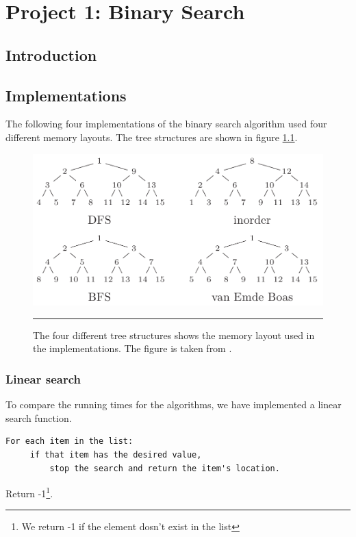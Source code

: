 
\chapter{Project 1: Binary Search} %

\label{Chapter1} %



\section{Introduction}



\section{Implementations}
The following four implementations of the binary search algorithm used four different memory layouts. The tree structures are shown in figure \ref{fig:memory_layouts}.

\begin{figure}[htbp]
	\centering
		\includegraphics[width=\textwidth]{./Figures/Project1/MemoryLayouts.png}
		\rule{35em}{0.5pt}
	\caption[Memory layouts]{
	The four different tree structures shows the memory layout used in the implementations. The figure is taken from \citep{binAlg}.
	}
	\label{fig:memory_layouts}
\end{figure}


\subsection{Linear search}
To compare the running times for the algorithms, we have implemented a linear search function.
\begin{verbatim}
For each item in the list:
     if that item has the desired value,
         stop the search and return the item's location.
\end{verbatim}
 Return -1\footnote{We return -1 if the element dosn't exist in the list}.

